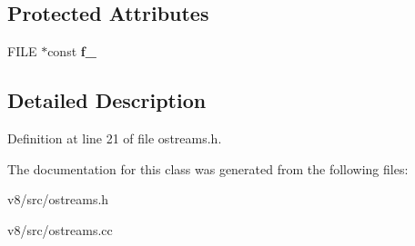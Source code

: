 \subsection*{Protected Attributes}
\begin{DoxyCompactItemize}
\item 
\mbox{\label{classv8_1_1internal_1_1OFStreamBase_a8f78fa74ae8177fe0586a7f36aafde64}} 
F\+I\+LE $\ast$const {\bfseries f\+\_\+}
\end{DoxyCompactItemize}


\subsection{Detailed Description}


Definition at line 21 of file ostreams.\+h.



The documentation for this class was generated from the following files\+:\begin{DoxyCompactItemize}
\item 
v8/src/ostreams.\+h\item 
v8/src/ostreams.\+cc\end{DoxyCompactItemize}
